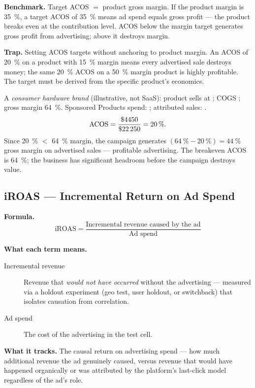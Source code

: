 \textbf{Benchmark.} Target ACOS $=$ product gross margin. If the product margin is
\qty{35}{\percent}, a target ACOS of \qty{35}{\percent} means ad spend equals gross profit
--- the product breaks even at the contribution level. ACOS below the margin target
generates gross profit from advertising; above it destroys margin.

\textbf{Trap.} Setting ACOS targets without anchoring to product margin. An ACOS of
\qty{20}{\percent} on a product with \qty{15}{\percent} margin means every advertised sale
destroys money; the same \qty{20}{\percent} ACOS on a \qty{50}{\percent} margin product is
highly profitable. The target must be derived from the specific product's economics.

\begin{example}
A \textit{consumer hardware brand} (illustrative, not SaaS): product sells at ;
COGS ; gross margin \qty{64}{\percent}. Sponsored Products spend: ;
attributed sales: .
\[
  \mathrm{ACOS} = \frac{\$\num{4450}}{\$\num{22250}} = \qty{20}{\percent}.
\]
Since \qty{20}{\percent} $<$ \qty{64}{\percent} margin, the campaign generates
$(\qty{64}{\percent} - \qty{20}{\percent}) = \qty{44}{\percent}$ gross margin on advertised
sales --- profitable advertising. The breakeven ACOS is \qty{64}{\percent}; the business has
significant headroom before the campaign destroys value.
\end{example}


\subsection{iROAS --- Incremental Return on Ad Spend}

\textbf{Formula.}
\[
  \mathrm{iROAS} = \frac{\text{Incremental revenue caused by the ad}}{\text{Ad spend}}
\]

\textbf{What each term means.}
\begin{description}
  \item[Incremental revenue] Revenue that \emph{would not have occurred} without the
    advertising --- measured via a holdout experiment (geo test, user holdout, or switchback)
    that isolates causation from correlation.
  \item[Ad spend] The cost of the advertising in the test cell.
\end{description}

\textbf{What it tracks.} The causal return on advertising spend --- how much additional
revenue the ad genuinely caused, versus revenue that would have happened organically or was
attributed by the platform's last-click model regardless of the ad's role.

